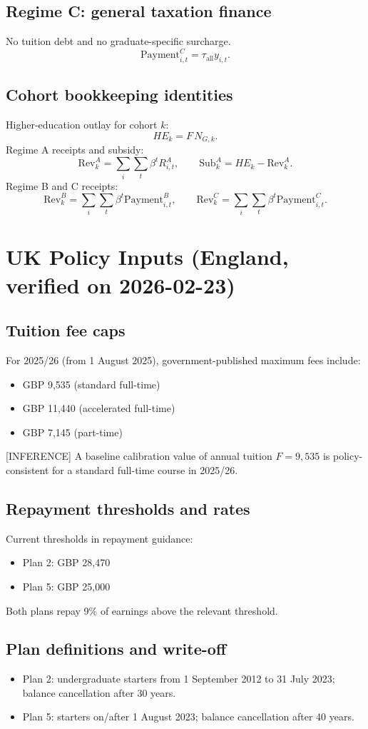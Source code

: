 \documentclass[11pt]{article}
\begin{document}
\subsection{Regime C: general taxation finance}
No tuition debt and no graduate-specific surcharge.
\[
\text{Payment}_{i,t}^{C}=\tau_{\text{all}}y_{i,t}.
\]

\subsection{Cohort bookkeeping identities}
Higher-education outlay for cohort $k$:
\[
HE_k=F\,N_{G,k}.
\]
Regime A receipts and subsidy:
\[
\text{Rev}_k^A=\sum_i\sum_t\beta^t R_{i,t}^{A},\qquad \text{Sub}_k^A=HE_k-\text{Rev}_k^A.
\]
Regime B and C receipts:
\[
\text{Rev}_k^B=\sum_i\sum_t\beta^t\text{Payment}_{i,t}^{B},\qquad
\text{Rev}_k^C=\sum_i\sum_t\beta^t\text{Payment}_{i,t}^{C}.
\]

\section{UK Policy Inputs (England, verified on 2026-02-23)}
\subsection{Tuition fee caps}
For 2025/26 (from 1 August 2025), government-published maximum fees include:
\begin{itemize}
\item GBP 9,535 (standard full-time)
\item GBP 11,440 (accelerated full-time)
\item GBP 7,145 (part-time)
\end{itemize}
[INFERENCE] A baseline calibration value of annual tuition $F=9{,}535$ is policy-consistent for a standard full-time course in 2025/26.

\subsection{Repayment thresholds and rates}
Current thresholds in repayment guidance:
\begin{itemize}
\item Plan 2: GBP 28,470
\item Plan 5: GBP 25,000
\end{itemize}
Both plans repay 9\% of earnings above the relevant threshold.

\subsection{Plan definitions and write-off}
\begin{itemize}
\item Plan 2: undergraduate starters from 1 September 2012 to 31 July 2023; balance cancellation after 30 years.
\item Plan 5: starters on/after 1 August 2023; balance cancellation after 40 years.
\end{itemize}
\end{document}
